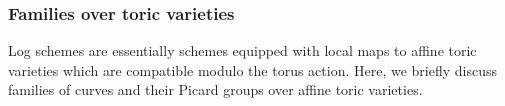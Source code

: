 \documentclass[a4paper,11pt]{amsart} %
\numberwithin{equation}{subsection}
\newcommand{\on}[1]{\operatorname{#1}}
\newcommand{\bb}[1]{{\mathbb{#1}}}
\newcommand{\ca}[1]{{\mathcal{#1}}}
\theoremstyle{definition}
\theoremstyle{plain}%
\theoremstyle{remark}
\begin{document}
    

\subsubsection{Families over toric varieties}

Log schemes are essentially schemes equipped with local maps to affine toric varieties which are compatible modulo the torus action. Here, we briefly discuss families of curves and their Picard groups over affine toric varieties.
\end{document}
